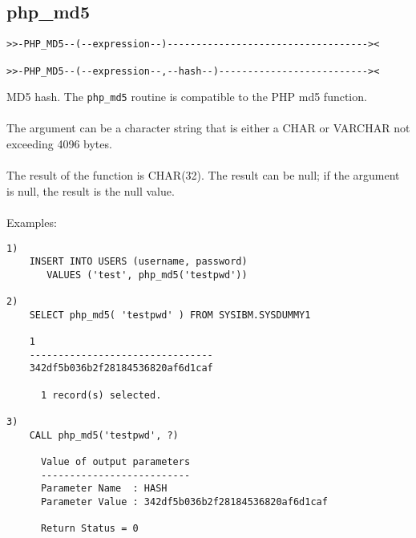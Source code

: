 \subsection{php\_md5} \label{phpmd5}
\begin{verbatim}
>>-PHP_MD5--(--expression--)-----------------------------------><

>>-PHP_MD5--(--expression--,--hash--)--------------------------><
\end{verbatim}
MD5 hash. The {\tt php\_md5} routine is compatible to the PHP md5 function.\\
\\
The argument can be a character string that is either a \mbox{CHAR} or \mbox{VARCHAR} not exceeding 4096 bytes.\\
\\
The result of the function is CHAR(32). The result can be null; if the argument is null, the result is the null value.\\
\\
Examples:
\begin{verbatim}
1)
    INSERT INTO USERS (username, password)
       VALUES ('test', php_md5('testpwd'))

2)
    SELECT php_md5( 'testpwd' ) FROM SYSIBM.SYSDUMMY1

    1
    --------------------------------
    342df5b036b2f28184536820af6d1caf

      1 record(s) selected.

3)
    CALL php_md5('testpwd', ?)

      Value of output parameters
      --------------------------
      Parameter Name  : HASH
      Parameter Value : 342df5b036b2f28184536820af6d1caf

      Return Status = 0
\end{verbatim}
\newpage
\hypertarget{haprmd5}{}
